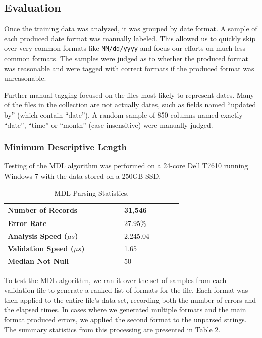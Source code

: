 \subsection{Evaluation}
Once the training data was analyzed, it was grouped by date format. A sample of each produced date format was manually labeled. This allowed us to quickly skip over very common formats like \texttt{MM/dd/yyyy} and focus our efforts on much less common formats. The samples were judged as to whether the produced format was reasonable and were tagged with correct formats if the produced format was unreasonable.

Further manual tagging focused on the files most likely to represent dates. Many of the files in the collection are not actually dates, such as fields named ``updated by'' (which contain ``date''). A random sample of 850 columns named exactly ``date'', ``time'' or ``month'' (case-insensitive) were manually judged.

\subsubsection{Minimum Descriptive Length}
Testing of the MDL algorithm was performed on a 24-core Dell T7610 running Windows 7 with the data stored on a 250GB SSD.


\begin{table}[ht]
\centering
\begin{tabular}{|p{0.48\linewidth}| p{0.24\linewidth}|}
\hline
\textbf{Number of Records} & 31,546\\ \hline
\textbf{Error Rate} & 27.95\% \\ \hline
\textbf{Analysis Speed ($\mu s$)} & 2,245.04 \\ \hline
\textbf{Validation Speed ($\mu s$)} & 1.65 \\ \hline
\textbf{Median Not Null} & 50 \\ \hline
\end{tabular}
\label{tab:mdlstats}
\caption{MDL Parsing Statistics.}
\end{table}



To test the MDL algorithm, we ran it over the set of samples from each validation file to generate a ranked list of formats for the file. Each format was then applied to the entire file's data set, recording both the number of errors and the elapsed times. In cases where we generated multiple formats and the main format produced errors, we applied the second format to the unparsed strings. The summary statistics from this processing are presented in Table 2.

